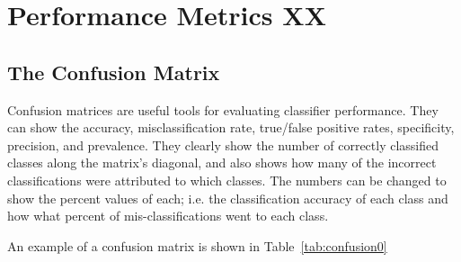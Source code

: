 \section{Performance Metrics XX}
\subsection{The Confusion Matrix}
Confusion matrices are useful tools for evaluating classifier performance. They can show the accuracy, misclassification rate, true/false positive rates, specificity, precision, and prevalence. They clearly show the number of correctly classified classes along the matrix's diagonal, and also shows how many of the incorrect classifications were attributed to which classes. The numbers can be changed to show the percent values of each; i.e. the classification accuracy of each class and how what percent of mis-classifications went to each class.

An example of a confusion matrix is shown in Table~\ref{tab:confusion0}






